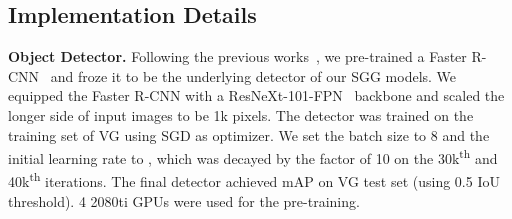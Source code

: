 \documentclass[10pt,twocolumn,letterpaper]{article}
\begin{document}
\vspace{-0.05in}
\subsection{Implementation Details}
\vspace{-0.05in}
\noindent\textbf{Object Detector.} Following the previous works~\cite{xu2017scene, zellers2018neural, tang2019learning}, we pre-trained a Faster R-CNN~\cite{ren2015faster} and froze it to be the underlying detector of our SGG models. We equipped the Faster R-CNN with a ResNeXt-101-FPN~\cite{lin2017feature, xie2017aggregated} backbone and scaled the longer side of input images to be 1k pixels. The detector was trained on the training set of VG using SGD as optimizer. We set the batch size to 8 and the initial learning rate to , which was decayed by the factor of 10 on the 30k\textsuperscript{th} and 40k\textsuperscript{th} iterations. The final detector achieved  mAP on VG test set (using 0.5 IoU threshold). 4 2080ti GPUs were used for the pre-training. 
\end{document}
